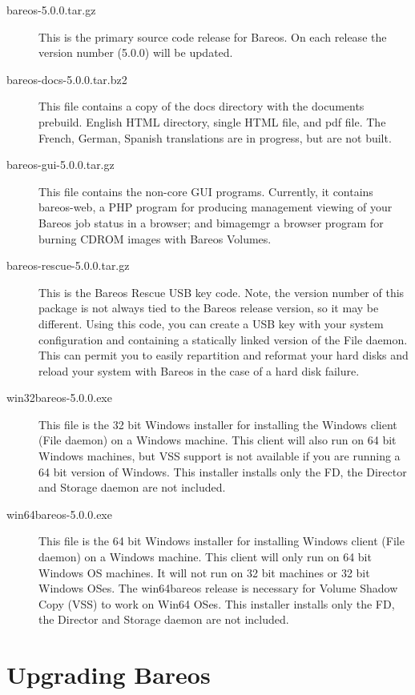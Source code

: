 \begin{description}
\item [bareos-5.0.0.tar.gz]
This is the primary source code release for Bareos. On each
release the version number (5.0.0) will be updated.

\item [bareos-docs-5.0.0.tar.bz2]
This file contains a copy of the docs directory with the
documents prebuild. English HTML directory, single HTML
file, and pdf file. The French, German, Spanish translations
are in progress, but are not built.

\item [bareos-gui-5.0.0.tar.gz]
This file contains the non-core GUI programs. Currently,
it contains bareos-web, a PHP program for producing management
viewing of your Bareos job status in a browser; and bimagemgr
a browser program for burning CDROM images with Bareos Volumes.

\item [bareos-rescue-5.0.0.tar.gz]
This is the Bareos Rescue USB key code. Note, the version number
of this package is not always tied to the Bareos release version, so
it may be different.  Using this code, you can create a USB key
with your system configuration and containing a statically
linked version of the File daemon. This can permit you to easily
repartition and reformat your hard disks and reload your
system with Bareos in the case of a hard disk failure.

\item [win32bareos-5.0.0.exe]
This file is the 32 bit Windows installer for installing
the Windows client (File daemon) on a Windows machine.
This client will also run on 64 bit Windows machines, but
VSS support is not available if you are running a 64 bit
version of Windows.  This installer installs only the FD,
the Director and Storage daemon are not included.

\item [win64bareos-5.0.0.exe]
This file is the 64 bit Windows installer for installing
Windows client (File daemon) on a Windows machine.
This client will only run on 64 bit Windows OS machines.
It will not run on 32 bit machines or 32 bit Windows OSes.
The win64bareos release is necessary for Volume Shadow
Copy (VSS) to work on Win64 OSes.  This installer
installs only the FD, the Director and Storage daemon
are not included.

\end{description}

\label{upgrading1}
\section{Upgrading Bareos}

